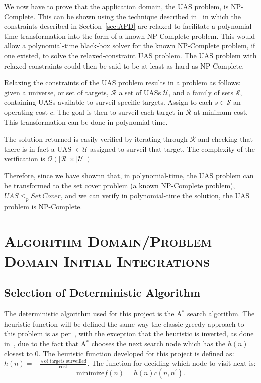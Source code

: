 \documentclass[conference]{IEEEtran}
\newcommand{\heuristic}{${h(n) = -\frac{\text{\# of targets
surveilled}}{\text{cost}}}$}
\newcommand{\bigoh}[1]{\ensuremath{\mathcal{O}(#1)}}		%
\begin{document}
We now have to prove that the application domain, the UAS problem, is
NP-Complete. This can be shown using the technique described
in~\cite{586textbook} in which the constraints described in
Section~\ref{sec:APD} are relaxed to facilitate a polynomial-time
transformation into the form of a known NP-Complete problem. This would allow a
polynomial-time black-box solver for the known NP-Complete problem, if one
existed, to solve the relaxed-constraint UAS problem. The UAS problem with
relaxed constraints could then be said to be at least as hard as NP-Complete.

Relaxing the constraints of the UAS problem results in a problem as follows:
given a universe, or set of targets, $\mathcal{R}$ a set of UASs $\mathcal{U}$,
and a family of sets $\mathcal{S}$, containing UASs available to surveil
specific targets. Assign to each $s \in \mathcal{S}$ an operating cost $c$. The
goal is then to surveil each target in $\mathcal{R}$ at minimum cost. This
transformation can be done in polynomial time.

The solution returned is easily verified by iterating through $\mathcal{R}$ and
checking that there is in fact a UAS $\in \mathcal{U}$ assigned to surveil that
target. The complexity of the verification is ${\bigoh{|\mathcal{R}| \times
|\mathcal{U}|}}$

Therefore, since we have shownn that, in polynomial-time, the UAS problem can
be transformed to the set cover problem (a known NP-Complete problem),
${\mathit{UAS} \leq_p \mathit{Set\ Cover}}$, and we can verify in
polynomial-time the solution, the UAS problem is NP-Complete.


\section{\textsc{Algorithm Domain/Problem Domain Initial Integrations}} \label{sec:initIntegration}


\subsection{Selection of Deterministic Algorithm} \label{sec:detAlg}

The deterministic algorithm used for this project is the A$^*$ search
algorithm. The heuristic function will be defined the same way the classic
greedy approach to this problem is as per~\cite{wiki:SCP}, with the exception
that the heuristic is inverted, as done in~\cite{pjcvphw8}, due to the fact
that A$^*$ chooses the next search node which has the $h(n)$ closest to $0$.
The heuristic function developed for this project is defined as: \heuristic.
The function for deciding which node to visit next is: \[ \text{minimize} f(n)
= h(n) c(n,n^\prime).\]
\end{document}
